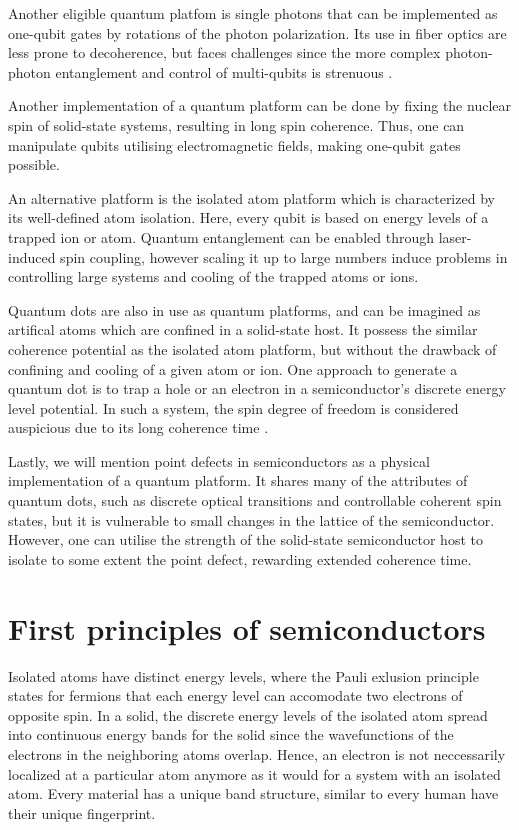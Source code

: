 Another eligible quantum platfom is single photons that can be implemented as one-qubit gates by rotations of the photon polarization. Its use in fiber optics are less prone to decoherence, but faces challenges since the more complex photon-photon entanglement and control of multi-qubits is strenuous \cite{Ladd2010}.

Another implementation of a quantum platform can be done by fixing the nuclear spin of solid-state systems, resulting in long spin coherence. Thus, one can manipulate qubits utilising electromagnetic fields, making one-qubit gates possible.

An alternative platform is the isolated atom platform which is characterized by its well-defined atom isolation. Here, every qubit is based on energy levels of a trapped ion or atom. Quantum entanglement can be enabled through laser-induced spin coupling, however scaling it up to large numbers induce problems in controlling large systems and cooling of the trapped atoms or ions.

Quantum dots are also in use as quantum platforms, and can be imagined as artifical atoms which are confined in a solid-state host. It possess the similar coherence potential as the isolated atom platform, but without the drawback of confining and cooling of a given atom or ion. One approach to generate a quantum dot is to trap a hole or an electron in a semiconductor's discrete energy level potential. In such a system, the spin degree of freedom is considered auspicious due to its long coherence time \cite{Acin2018}.

Lastly, we will mention point defects in semiconductors as a physical implementation of a quantum platform. It shares many of the attributes of quantum dots, such as discrete optical transitions and controllable coherent spin states, but it is vulnerable to small changes in the lattice of the semiconductor. However, one can utilise the strength of the solid-state semiconductor host to isolate to some extent the point defect, rewarding extended coherence time.

\clearpage
\section{First principles of semiconductors}

Isolated atoms have distinct energy levels, where the Pauli exlusion principle \cite{Pauli1925} states for fermions that each energy level can accomodate two electrons of opposite spin. In a solid, the discrete energy levels of the isolated atom spread into continuous energy bands for the solid since the wavefunctions of the electrons in the neighboring atoms overlap. Hence, an electron is not neccessarily localized at a particular atom anymore as it would for a system with an isolated atom. Every material has a unique band structure, similar to every human have their unique fingerprint.

